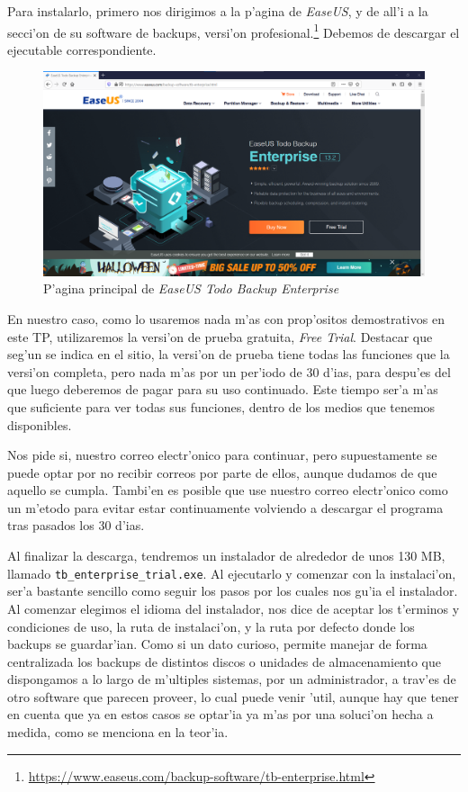 \documentclass[11pt]{article}
\begin{document}
	Para instalarlo, primero nos dirigimos a la p'agina de \textit{EaseUS}, y de all'i a la secci'on de su software de backups, versi'on profesional.\footnote{\url{https://www.easeus.com/backup-software/tb-enterprise.html}} Debemos de descargar el ejecutable correspondiente.
	
	\begin{figure}[H]
		\centering
		\includegraphics[width=.8\textwidth]{Images/easeus/website}
		\caption{P'agina principal de \textit{EaseUS Todo Backup Enterprise}}
	\end{figure}
	
	En nuestro caso, como lo usaremos nada m'as con prop'ositos demostrativos en este TP, utilizaremos la versi'on de prueba gratuita, \textit{Free Trial}. Destacar que seg'un se indica en el sitio, la versi'on de prueba tiene todas las funciones que la versi'on completa, pero nada m'as por un per'iodo de 30 d'ias, para despu'es del que luego deberemos de pagar para su uso continuado. Este tiempo ser'a m'as que suficiente para ver todas sus funciones, dentro de los medios que tenemos disponibles. 
	
	Nos pide si, nuestro correo electr'onico para continuar, pero supuestamente se puede optar por no recibir correos por parte de ellos, aunque dudamos de que aquello se cumpla. Tambi'en es posible que use nuestro correo electr'onico como un m'etodo para evitar estar continuamente volviendo a descargar el programa tras pasados los 30 d'ias.
	
	Al finalizar la descarga, tendremos un instalador de alrededor de unos 130 MB, llamado \texttt{tb\_enterprise\_trial.exe}. Al ejecutarlo y comenzar con la instalaci'on, ser'a bastante sencillo como seguir los pasos por los cuales nos gu'ia el instalador. Al comenzar elegimos el idioma del instalador, nos dice de aceptar los t'erminos y condiciones de uso, la ruta de instalaci'on, y la ruta por defecto donde los backups se guardar'ian. Como si un dato curioso, permite manejar de forma centralizada los backups de distintos discos o unidades de almacenamiento que dispongamos a lo largo de m'ultiples sistemas, por un administrador, a trav'es de otro software que parecen proveer,  lo cual puede venir 'util, aunque hay que tener en cuenta que ya en estos casos se optar'ia ya m'as por una soluci'on hecha a medida, como se menciona en la teor'ia.
	
\end{document}
